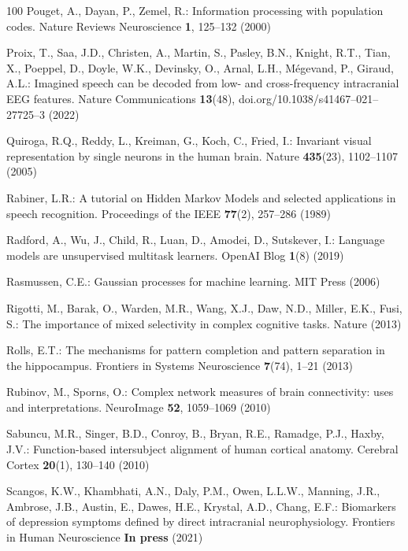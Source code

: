 \documentclass{llmxive}
\begin{document}
\begin{thebibliography}{100}
Pouget, A., Dayan, P., Zemel, R.: Information processing with population codes.
  Nature Reviews Neuroscience  \textbf{1},  125--132 (2000)

Proix, T., Saa, J.D., Christen, A., Martin, S., Pasley, B.N., Knight, R.T.,
  Tian, X., Poeppel, D., Doyle, W.K., Devinsky, O., Arnal, L.H., M\'{e}gevand,
  P., Giraud, A.L.: Imagined speech can be decoded from low- and
  cross-frequency intracranial {EEG} features. Nature Communications
  \textbf{13}(48),  doi.org/10.1038/s41467--021--27725--3 (2022)

Quiroga, R.Q., Reddy, L., Kreiman, G., Koch, C., Fried, I.: Invariant visual
  representation by single neurons in the human brain. Nature
  \textbf{435}(23),  1102--1107 (2005)

Rabiner, L.R.: A tutorial on {Hidden Markov Models} and selected applications
  in speech recognition. Proceedings of the {IEEE}  \textbf{77}(2),  257--286
  (1989)

Radford, A., Wu, J., Child, R., Luan, D., Amodei, D., Sutskever, I.: Language
  models are unsupervised multitask learners. {OpenAI} Blog  \textbf{1}(8)
  (2019)

Rasmussen, C.E.: {Gaussian} processes for machine learning. {MIT} Press (2006)

Rigotti, M., Barak, O., Warden, M.R., Wang, X.J., Daw, N.D., Miller, E.K.,
  Fusi, S.: The importance of mixed selectivity in complex cognitive tasks.
  Nature  (2013)

Rolls, E.T.: The mechanisms for pattern completion and pattern separation in
  the hippocampus. Frontiers in Systems Neuroscience  \textbf{7}(74),  1--21
  (2013)

Rubinov, M., Sporns, O.: Complex network measures of brain connectivity: uses
  and interpretations. {NeuroImage}  \textbf{52},  1059--1069 (2010)

Sabuncu, M.R., Singer, B.D., Conroy, B., Bryan, R.E., Ramadge, P.J., Haxby,
  J.V.: Function-based intersubject alignment of human cortical anatomy.
  Cerebral Cortex  \textbf{20}(1),  130--140 (2010)

Scangos, K.W., Khambhati, A.N., Daly, P.M., Owen, L.L.W., Manning, J.R.,
  Ambrose, J.B., Austin, E., Dawes, H.E., Krystal, A.D., Chang, E.F.:
  Biomarkers of depression symptoms defined by direct intracranial
  neurophysiology. Frontiers in Human Neuroscience  \textbf{In press} (2021)


\end{thebibliography}
\end{document}
